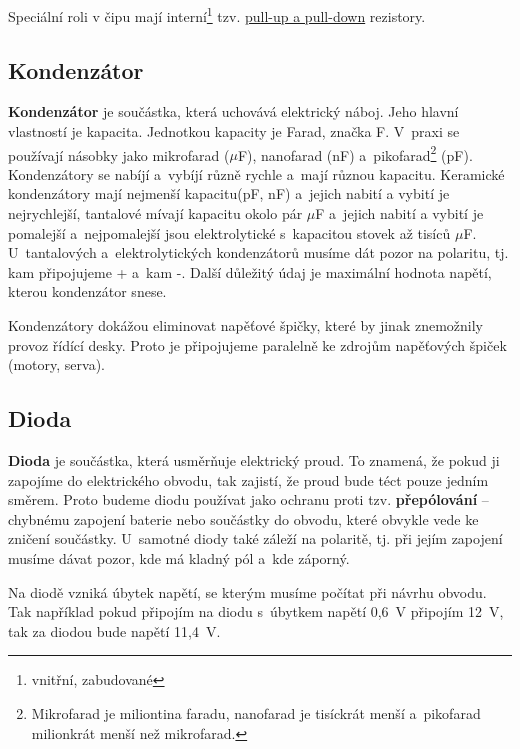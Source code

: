 Speciální roli v čipu mají interní\footnote{vnitřní, zabudované} tzv. 
\href{https://maly.gitbooks.io/hradla-volty-jednocipy/13_jak_naucit_kamen_pocitat/139_pull_up_apulldown.html}{pull-up a pull-down} rezistory. 


\subsection{Kondenzátor}

{\bf Kondenzátor} je součástka, která uchovává elektrický náboj. 
Jeho hlavní vlastností je kapacita. Jednotkou kapacity je Farad, značka F. 
V~praxi se používají násobky jako mikrofarad ($\mu$F), nanofarad (nF) a~pikofarad\footnote{Mikrofarad je miliontina faradu,
	 nanofarad je tisíckrát menší a~pikofarad milionkrát menší než mikrofarad.} (pF). 
	Kondenzátory se nabíjí a~vybíjí různě rychle a~mají různou kapacitu. Keramické kondenzátory 
  mají nejmenší kapacitu(pF, nF) a~jejich nabití a vybití je nejrychlejší, tantalové  
 mívají kapacitu okolo pár $\mu$F a~jejich nabití a vybití je pomalejší a~nejpomalejší 
jsou elektrolytické s~kapacitou stovek až tisíců $\mu$F. 
U~tantalových a~elektrolytických kondenzátorů musíme dát pozor na polaritu, tj. kam připojujeme + a~kam -. 
Další důležitý údaj je maximální hodnota napětí, kterou kondenzátor snese. 

Kondenzátory dokážou eliminovat napěťové špičky, které by jinak znemožnily provoz řídící desky. 
Proto je připojujeme paralelně ke zdrojům napěťových špiček (motory, serva).

\subsection{Dioda}

{\bf Dioda}  je součástka, která usměrňuje elektrický proud. 
To znamená, že pokud ji zapojíme do elektrického obvodu, tak zajistí, že proud bude téct pouze jedním směrem. 
Proto budeme diodu používat jako ochranu 
proti tzv. {\bf přepólování}
 -- chybnému zapojení baterie nebo součástky do obvodu, které obvykle vede ke zničení součástky. 
U~samotné diody také záleží na polaritě, tj. při jejím zapojení musíme dávat pozor, kde má kladný pól a~kde záporný. 

Na diodě vzniká úbytek napětí, se kterým musíme počítat při návrhu obvodu. 
Tak například pokud připojím na diodu s~úbytkem napětí 0,6~V připojím 12~V, tak za diodou bude napětí 11,4~V. 

